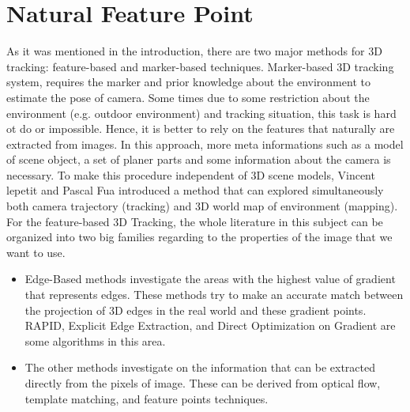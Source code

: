 \chapter{Natural Feature Point}\label{chapter:Natural Feature Point}
As it was mentioned in the introduction, there are two major methods for 3D tracking: feature-based and marker-based techniques. Marker-based 3D tracking system, requires the marker and prior knowledge about the environment to estimate the pose of camera. Some times due to some restriction about the environment (e.g. outdoor environment) and tracking situation, this task is hard ot do or impossible. Hence, it is better to rely on the features that naturally are extracted from images. In this approach, more meta informations such as a model of scene object, a set of planer parts and some information about the camera is necessary. To make this procedure independent of 3D scene models, Vincent lepetit and Pascal Fua \cite{lepetit2005monocular} introduced a method that can explored simultaneously both camera trajectory (tracking) and 3D world map of environment (mapping). \\
For the feature-based 3D Tracking, the whole literature in this subject can be organized into two big families regarding to the properties of the image that we want to use.
\begin{itemize}
\item Edge-Based methods investigate the areas with the highest value of gradient that represents edges. These methods try to make an accurate match between the projection of 3D edges in the real world and these gradient points. RAPID, Explicit Edge Extraction, and Direct Optimization on Gradient are some algorithms in this area. 
\item The other methods investigate on the information that can be extracted directly from the pixels of image. These can be derived from optical flow, template matching, and feature points techniques.
\end{itemize}

